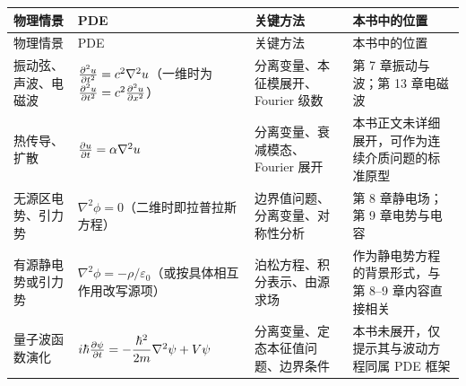 \begin{longtable}{p{}p{}p{}p{}}
\toprule
物理情景 & PDE & 关键方法 & 本书中的位置 \\
\midrule
\endfirsthead

\toprule
物理情景 & PDE & 关键方法 & 本书中的位置 \\
\midrule
\endhead

\bottomrule
\endfoot

振动弦、声波、电磁波 & $\pdv[2]{u}{t}=c^2\nabla^2 u$（一维时为 $\pdv[2]{u}{t}=c^2\pdv[2]{u}{x}$） & 分离变量、本征模展开、Fourier 级数 & 第 7 章振动与波；第 13 章电磁波 \\

热传导、扩散 & $\pdv{u}{t}=\alpha\nabla^2 u$ & 分离变量、衰减模态、Fourier 展开 & 本书正文未详细展开，可作为连续介质问题的标准原型 \\

无源区电势、引力势 & $\nabla^2 \phi=0$（二维时即拉普拉斯方程） & 边界值问题、分离变量、对称性分析 & 第 8 章静电场；第 9 章电势与电容 \\

有源静电势或引力势 & $\nabla^2 \phi=-\rho/\varepsilon_0$（或按具体相互作用改写源项） & 泊松方程、积分表示、由源求场 & 作为静电势方程的背景形式，与第 8--9 章内容直接相关 \\

量子波函数演化 & $i\hbar\pdv{\psi}{t}=-\dfrac{\hbar^2}{2m}\nabla^2\psi+V\psi$ & 分离变量、定态本征值问题、边界条件 & 本书未展开，仅提示其与波动方程同属 PDE 框架 \\

\end{longtable}

